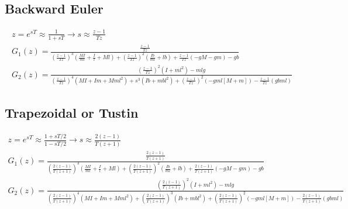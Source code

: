 	\subsection{Backward Euler}
		
		\begin{eqnarray}
			z = e^{sT} \approx \frac{1}{1 + sT} \rightarrow s \approx \frac{z - 1}{Tz}\\			
			G_1\left(z\right)=\frac{\frac{z - 1}{Tz}}{\left( \frac{z - 1}{Tz}\right) ^3\left(\frac{MI}{ml}+\frac{I}{l}+Ml\right)+\left( \frac{z - 1}{Tz}\right) ^2\left(\frac{Ib}{ml}+lb\right)+\frac{z - 1}{Tz}(-gM-gm)-gb}
			\\
			G_2\left(z\right)=\frac{\left( \frac{z - 1}{Tz}\right) ^2\left(I+ml^2\right)-mlg}{\left( \frac{z - 1}{Tz}\right) ^4\left(MI+Im+Mml^2\right)+s^3\left(Ib+m{bl}^2\right)+\left( \frac{z - 1}{Tz}\right) ^2\left(-gml\left[M+m\right]\right)-\frac{z - 1}{Tz}\left(gbml\right)}
		\end{eqnarray}
	
	\subsection{Trapezoidal or Tustin}
		\begin{tiny}
		\begin{eqnarray}
			z = e^{sT} \approx \frac{1 + sT/2}{1 - sT/2} \rightarrow s \approx \frac{2\left( z - 1\right) }{T\left( z+1\right) }\\		
			G_1\left(z\right)=\frac{\frac{2\left( z - 1\right) }{T\left( z+1\right) }}{\left( \frac{2\left( z - 1\right) }{T\left( z+1\right) }\right) ^3\left(\frac{MI}{ml}+\frac{I}{l}+Ml\right)+\left( \frac{2\left( z - 1\right) }{T\left( z+1\right) }\right) ^2\left(\frac{Ib}{ml}+lb\right)+\frac{2\left( z - 1\right) }{T\left( z+1\right) }(-gM-gm)-gb}
			\\
			G_2\left(z\right)=\frac{\left( \frac{2\left( z - 1\right) }{T\left( z+1\right) }\right) ^2\left(I+ml^2\right)-mlg}{\left( \frac{2\left( z - 1\right) }{T\left( z+1\right) }\right) ^4\left(MI+Im+Mml^2\right)+\left( \frac{2\left( z - 1\right) }{T\left( z+1\right) }\right) ^3\left(Ib+m{bl}^2\right)+\left( \frac{2\left( z - 1\right) }{T\left( z+1\right) }\right) ^2\left(-gml\left[M+m\right]\right)-\frac{2\left( z - 1\right) }{T\left( z+1\right) }\left(gbml\right)}
		\end{eqnarray}
		\end{tiny}
		
